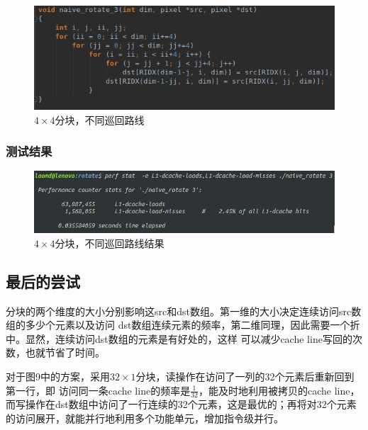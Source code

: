 \documentclass[12pt]{article}
\begin{document}
\begin{figure}[h]
\begin{center}
\includegraphics[width=\textwidth]{c3.png} %
\caption{$4 \times 4$分块，不同巡回路线}
\end{center}
\end{figure}

\subsubsection{测试结果}
\begin{figure}[h]
\begin{center}
\includegraphics[width=\textwidth]{p3.png} %
\caption{$4 \times 4$分块，不同巡回路线结果}
\end{center}
\end{figure}

\newpage
\subsection{最后的尝试}
分块的两个维度的大小分别影响这src和dst数组。第一维的大小决定连续访问src数组的多少个元素以及访问
dst数组连续元素的频率，第二维同理，因此需要一个折中。显然，连续访问dst数组的元素是有好处的，这样
可以减少cache line写回的次数，也就节省了时间。
\par 对于图9中的方案，采用$32 \times 1$分块，读操作在访问了一列的32个元素后重新回到第一行，即
访问同一条cache line的频率是$\frac{1}{32}$，能及时地利用被拷贝的cache line，
而写操作在dst数组中访问了一行连续的32个元素，这是最优的；再将对32个元素的访问展开，就能并行地利用多个功能单元，增加指令级并行。
\end{document}
